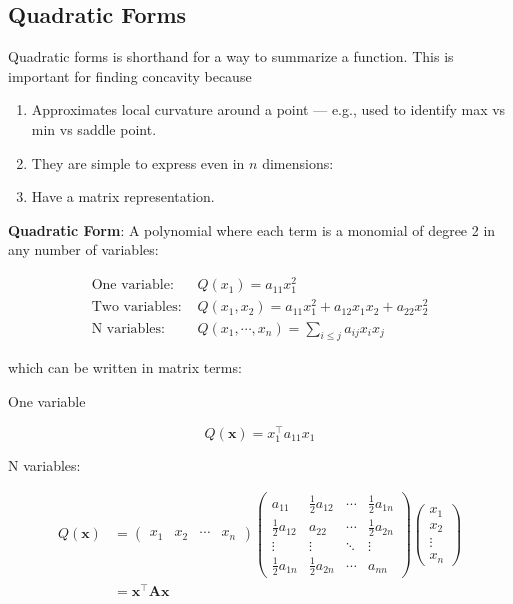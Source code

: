 \documentclass[]{book}
\providecommand{\tightlist}{%
  \setlength{\itemsep}{0pt}\setlength{\parskip}{0pt}}
\theoremstyle{definition}
\theoremstyle{definition}
\theoremstyle{definition}
\theoremstyle{remark}
\begin{document}
\subsection*{Quadratic Forms}\label{quadratic-forms}

Quadratic forms is shorthand for a way to summarize a function. This is
important for finding concavity because

\begin{enumerate}
\def\labelenumi{\arabic{enumi}.}
\tightlist
\item
  Approximates local curvature around a point --- e.g., used to identify
  max vs min vs saddle point.
\item
  They are simple to express even in \(n\) dimensions:
\item
  Have a matrix representation.
\end{enumerate}

\textbf{Quadratic Form}: A polynomial where each term is a monomial of
degree 2 in any number of variables:

\begin{align*}
\text{One variable: }& Q(x_1) = a_{11}x_1^2\\
\text{Two variables: }& Q(x_1,x_2) = a_{11}x_1^2 + a_{12}x_1x_2 + a_{22}x_2^2\\
\text{N variables: }& Q(x_1,\cdots,x_n)=\sum\limits_{i\le j} a_{ij}x_i x_j
\end{align*}

which can be written in matrix terms:

One variable

\[Q(\mathbf{x}) = x_1^\top a_{11} x_1\]

N variables:

\begin{align*}
Q(\mathbf{x}) &=\begin{pmatrix} x_1 & x_2 & \cdots & x_n \end{pmatrix}\begin{pmatrix}
a_{11}&\frac{1}{2}a_{12}&\cdots&\frac{1}{2}a_{1n}\\
\frac{1}{2}a_{12}&a_{22}&\cdots&\frac{1}{2}a_{2n}\\
\vdots&\vdots&\ddots&\vdots\\
\frac{1}{2}a_{1n}&\frac{1}{2}a_{2n}&\cdots&a_{nn}
\end{pmatrix}
\begin{pmatrix} x_1\\x_2\\\vdots\\x_n\end{pmatrix}\\
&= \mathbf{x}^\top\mathbf{Ax}
\end{align*}
\end{document}
